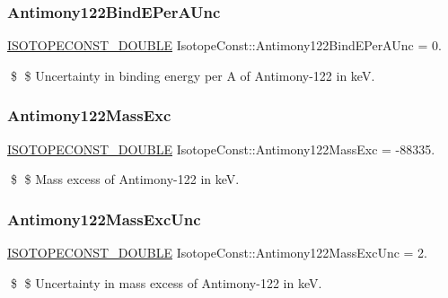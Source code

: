 \subsubsection{\texorpdfstring{Antimony122\+Bind\+E\+Per\+A\+Unc}{Antimony122BindEPerAUnc}}
{\footnotesize\ttfamily \mbox{\hyperlink{group___isotope_const-_macros_ga8f45a7272ce02c0b4c65c44636ed719a}{I\+S\+O\+T\+O\+P\+E\+C\+O\+N\+S\+T\+\_\+\+D\+O\+U\+B\+LE}} Isotope\+Const\+::\+Antimony122\+Bind\+E\+Per\+A\+Unc = 0.}

\$ \$ Uncertainty in binding energy per A of Antimony-\/122 in keV. \mbox{\label{group___isotope_const-_antimony-_sb122_ga0a094561c5a3a4f89823cbcf630319fe}} 
\subsubsection{\texorpdfstring{Antimony122\+Mass\+Exc}{Antimony122MassExc}}
{\footnotesize\ttfamily \mbox{\hyperlink{group___isotope_const-_macros_ga8f45a7272ce02c0b4c65c44636ed719a}{I\+S\+O\+T\+O\+P\+E\+C\+O\+N\+S\+T\+\_\+\+D\+O\+U\+B\+LE}} Isotope\+Const\+::\+Antimony122\+Mass\+Exc = -\/88335.}

\$ \$ Mass excess of Antimony-\/122 in keV. \mbox{\label{group___isotope_const-_antimony-_sb122_ga55a135883998b8d2dea4061f026810ab}} 
\subsubsection{\texorpdfstring{Antimony122\+Mass\+Exc\+Unc}{Antimony122MassExcUnc}}
{\footnotesize\ttfamily \mbox{\hyperlink{group___isotope_const-_macros_ga8f45a7272ce02c0b4c65c44636ed719a}{I\+S\+O\+T\+O\+P\+E\+C\+O\+N\+S\+T\+\_\+\+D\+O\+U\+B\+LE}} Isotope\+Const\+::\+Antimony122\+Mass\+Exc\+Unc = 2.}

\$ \$ Uncertainty in mass excess of Antimony-\/122 in keV. \mbox{\label{group___isotope_const-_antimony-_sb122_ga960b2dd2c347ab19207ebaa3de54c2b0}} 
